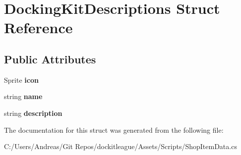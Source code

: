 \hypertarget{struct_docking_kit_descriptions}{}\section{Docking\+Kit\+Descriptions Struct Reference}
\label{struct_docking_kit_descriptions}
\subsection*{Public Attributes}
\begin{DoxyCompactItemize}
\item 
\hypertarget{struct_docking_kit_descriptions_a7f84c6dce60f29c90f0c6a8f0c8e36dd}{}\label{struct_docking_kit_descriptions_a7f84c6dce60f29c90f0c6a8f0c8e36dd} 
Sprite {\bfseries icon}
\item 
\hypertarget{struct_docking_kit_descriptions_a665fc70d012a272db3fdc1786a4f6b1b}{}\label{struct_docking_kit_descriptions_a665fc70d012a272db3fdc1786a4f6b1b} 
string {\bfseries name}
\item 
\hypertarget{struct_docking_kit_descriptions_a3efe26d52d7c89b3aa298c97465a9a9e}{}\label{struct_docking_kit_descriptions_a3efe26d52d7c89b3aa298c97465a9a9e} 
string {\bfseries description}
\end{DoxyCompactItemize}


The documentation for this struct was generated from the following file\+:\begin{DoxyCompactItemize}
\item 
C\+:/\+Users/\+Andreas/\+Git Repos/dockitleague/\+Assets/\+Scripts/Shop\+Item\+Data.\+cs\end{DoxyCompactItemize}
